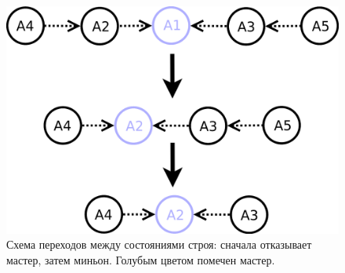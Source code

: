 \documentclass[a4paper, 14pt]{extarticle}
\begin{document}
\begin{figure}
	\centering
	\includegraphics[width=0.7\linewidth]{platoon/with-crashes-diagram}
	\caption{Схема переходов между состояниями строя: сначала отказывает мастер, затем миньон. Голубым цветом помечен мастер.}
	\label{fig:with-crashes-diagram}
\end{figure}
\end{document}
